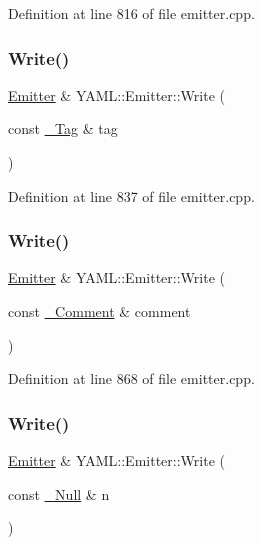 Definition at line 816 of file emitter.\+cpp.

\mbox{\label{class_y_a_m_l_1_1_emitter_ae28cf87092e7b34641887a41e068da79}} 
\subsubsection{\texorpdfstring{Write()}{Write()}\hspace{0.1cm}{\footnotesize\ttfamily [6/9]}}
{\footnotesize\ttfamily \mbox{\hyperlink{class_y_a_m_l_1_1_emitter}{Emitter}} \& Y\+A\+M\+L\+::\+Emitter\+::\+Write (\begin{DoxyParamCaption}\item[{const \mbox{\hyperlink{struct_y_a_m_l_1_1___tag}{\+\_\+\+Tag}} \&}]{tag }\end{DoxyParamCaption})}



Definition at line 837 of file emitter.\+cpp.

\mbox{\label{class_y_a_m_l_1_1_emitter_a7683ef422503881a0db4d77fad2b1c37}} 
\subsubsection{\texorpdfstring{Write()}{Write()}\hspace{0.1cm}{\footnotesize\ttfamily [7/9]}}
{\footnotesize\ttfamily \mbox{\hyperlink{class_y_a_m_l_1_1_emitter}{Emitter}} \& Y\+A\+M\+L\+::\+Emitter\+::\+Write (\begin{DoxyParamCaption}\item[{const \mbox{\hyperlink{struct_y_a_m_l_1_1___comment}{\+\_\+\+Comment}} \&}]{comment }\end{DoxyParamCaption})}



Definition at line 868 of file emitter.\+cpp.

\mbox{\label{class_y_a_m_l_1_1_emitter_a4cdef3d2d2bf7999595371f2cc89322e}} 
\subsubsection{\texorpdfstring{Write()}{Write()}\hspace{0.1cm}{\footnotesize\ttfamily [8/9]}}
{\footnotesize\ttfamily \mbox{\hyperlink{class_y_a_m_l_1_1_emitter}{Emitter}} \& Y\+A\+M\+L\+::\+Emitter\+::\+Write (\begin{DoxyParamCaption}\item[{const \mbox{\hyperlink{struct_y_a_m_l_1_1___null}{\+\_\+\+Null}} \&}]{n }\end{DoxyParamCaption})}



